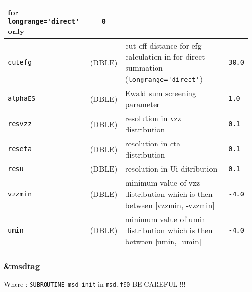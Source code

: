 \documentclass[a4paper]{article}
\begin{document}
\begin{longtable}{l|c|m{8cm}|m{2cm}}
                                              for \verb?longrange='direct'?  only \newline                                         & \verb?0? \\
\hline
\rule[-0.75cm]{0cm}{1.5cm}
\verb?cutefg?          & (DBLE)             & cut-off distance for efg calculation in for direct summation 
                                              (\verb?longrange='direct'?) & \verb?30.0? \\
\hline
\rule[-0.75cm]{0cm}{1.5cm}
\verb?alphaES?         & (DBLE)             & Ewald sum screening parameter                                                        & \verb?1.0? \\
\hline
\rule[-0.75cm]{0cm}{1.5cm}
\verb?resvzz?          & (DBLE)             & resolution in vzz distribution                                                       & \verb?0.1? \\
\hline
\rule[-0.75cm]{0cm}{1.5cm}
\verb?reseta?          & (DBLE)             & resolution in eta distribution                                                       & \verb?0.1? \\
\hline
\rule[-0.75cm]{0cm}{1.5cm}
\verb?resu?            & (DBLE)             & resolution in Ui ditribution                                                         & \verb?0.1? \\
\hline
\rule[-0.75cm]{0cm}{1.5cm}
\verb?vzzmin?          & (DBLE)             & minimum value of vzz distribution which is then between [vzzmin, -vzzmin]            & \verb?-4.0? \\ 
\hline
\rule[-0.75cm]{0cm}{1.5cm}
\verb?umin?            & (DBLE)             & minimum value of umin distribution which is then between [umin, -umin]               & \verb?-4.0? \\
\hline
\hline
\end{longtable}


\subsubsection{\&msdtag}

Where : \verb?SUBROUTINE msd_init? in \verb?msd.f90?
BE CAREFUL !!!
\newline
\end{document}
